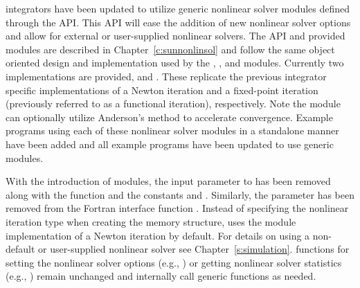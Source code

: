 {\sundials} integrators have been updated to utilize generic nonlinear solver
modules defined through the {\sunnonlinsol} API. This API will ease the addition
of new nonlinear solver options and allow for external or user-supplied
nonlinear solvers. The {\sunnonlinsol} API and {\sundials} provided modules are
described in Chapter~\ref{c:sunnonlinsol} and follow the same object oriented
design and implementation used by the {\nvector}, {\sunmatrix}, and {\sunlinsol}
modules. Currently two {\sunnonlinsol} implementations are provided,
{\sunnonlinsolnewton} and {\sunnonlinsolfixedpoint}. These replicate the
previous integrator specific implementations of a Newton iteration and a
fixed-point iteration (previously referred to as a functional iteration),
respectively. Note the {\sunnonlinsolfixedpoint} module can optionally utilize
Anderson's method to accelerate convergence. Example programs using each of
these nonlinear solver modules in a standalone manner have been added and all
{\cvode} example programs have been updated to use generic {\sunnonlinsol}
modules.

With the introduction of {\sunnonlinsol} modules, the input parameter 
to  has been removed along with the function
 and the constants  and .
Similarly, the  parameter has been removed from the Fortran interface
function . Instead of specifying the nonlinear iteration type when
creating the {\cvode} memory structure, {\cvode} uses the {\sunnonlinsolnewton}
module implementation of a Newton iteration by default. For details on using a
non-default or user-supplied nonlinear solver see Chapter~\ref{s:simulation}.
{\cvode} functions for setting the nonlinear solver options (e.g.,
) or getting nonlinear solver statistics (e.g.,
) remain unchanged and internally call generic
{\sunnonlinsol} functions as needed.


